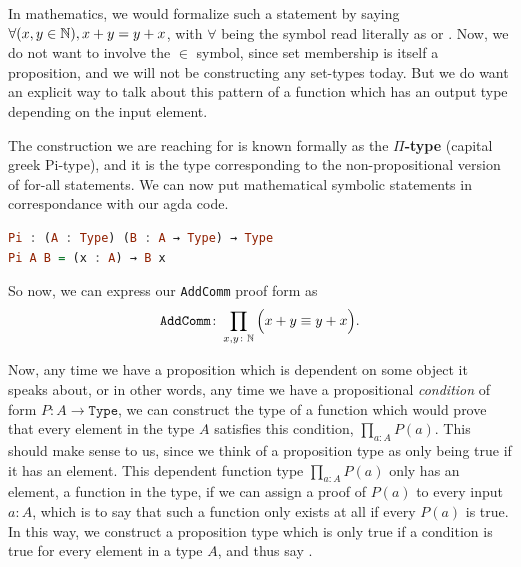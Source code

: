 \documentclass[11pt]{article}
\begin{document}
In mathematics, we would formalize such a statement by saying $\forall (x,y \in \mathbb{N}), x + y = y + x$, with $\forall$ being the symbol read literally as  or . Now, we do not want to involve the $\in$ symbol, since set membership is itself a proposition, and we will not be constructing any set-types today. But we do want an explicit way to talk about this pattern of a function which has an output type depending on the input element.

The construction we are reaching for is known formally as the $\Pi$\textbf{-type} (capital greek Pi-type), and it is the type corresponding to the non-propositional version of for-all statements. We can now put mathematical symbolic statements in correspondance with our agda code. \begin{lstlisting}[language=Haskell]
Pi : (A : Type) (B : A → Type) → Type
Pi A B = (x : A) → B x
\end{lstlisting}

So now, we can express our \texttt{AddComm} proof form as \begin{gather*}
\texttt{AddComm} \colon \prod_{x,y \colon \mathbb{N}} \Big( x + y \equiv y + x \Big).
\end{gather*}

Now, any time we have a proposition which is dependent on some object it speaks about, or in other words, any time we have a propositional \emph{condition} of form $P \colon A \to \mathtt{Type}$, we can construct the type of a function which would prove that every element in the type $A$ satisfies this condition, $\prod_{a : A} P(a)$. This should make sense to us, since we think of a proposition type as only being true if it has an element. This dependent function type $\prod_{a : A} P(a)$ only has an element, a function in the type, if we can assign a proof of $P(a)$ to every input $a \colon A$, which is to say that such a function only exists at all if every $P(a)$ is true. In this way, we construct a proposition type which is only true if a condition is true for every element in a type $A$, and thus say .
\end{document}

